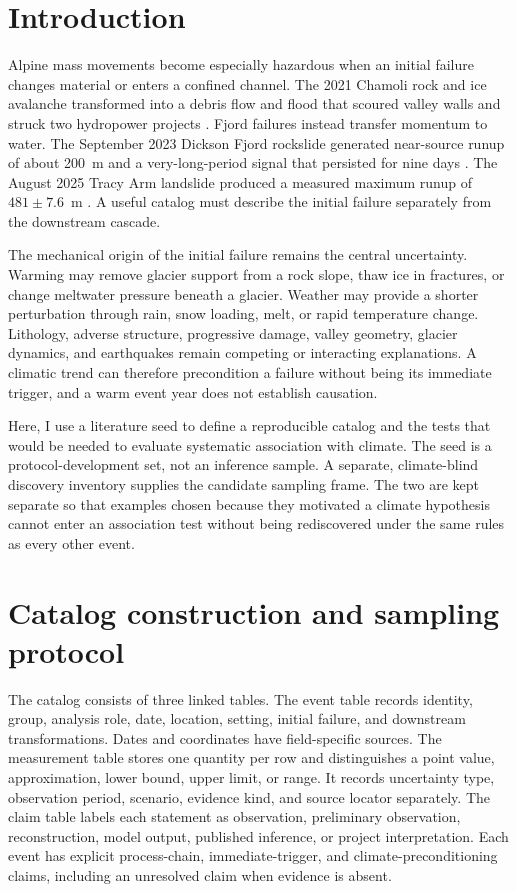 \documentclass[11pt]{article}
\begin{document}
\section{Introduction}

Alpine mass movements become especially hazardous when an initial failure
changes material or enters a confined channel. The 2021 Chamoli rock and ice
avalanche transformed into a debris flow and flood that scoured valley walls
and struck two hydropower projects \citep{Shugar2021}. Fjord failures instead
transfer momentum to water. The September 2023 Dickson Fjord rockslide
generated near-source runup of about 200~m and a very-long-period signal that
persisted for nine days \citep{Svennevig2024,Monahan2025}. The August 2025
Tracy Arm landslide produced a measured maximum runup of
$481\pm7.6$~m \citep{Shugar2026}. A useful catalog must describe the initial
failure separately from the downstream cascade.

The mechanical origin of the initial failure remains the central uncertainty.
Warming may remove glacier support from a rock slope, thaw ice in fractures,
or change meltwater pressure beneath a glacier. Weather may provide a shorter
perturbation through rain, snow loading, melt, or rapid temperature change.
Lithology, adverse structure, progressive damage, valley geometry, glacier
dynamics, and earthquakes remain competing or interacting explanations. A
climatic trend can therefore precondition a failure without being its
immediate trigger, and a warm event year does not establish causation.

Here, I use a literature seed to define a reproducible catalog and the tests
that would be needed to evaluate systematic association with climate. The
seed is a protocol-development set, not an inference sample. A separate,
climate-blind discovery inventory supplies the candidate sampling frame. The
two are kept separate so that examples chosen because they motivated a climate
hypothesis cannot enter an association test without being rediscovered under
the same rules as every other event.

\section{Catalog construction and sampling protocol}

The catalog consists of three linked tables. The event table records identity,
group, analysis role, date, location, setting, initial failure, and downstream
transformations. Dates and coordinates have field-specific sources. The
measurement table stores one quantity per row and distinguishes a point value,
approximation, lower bound, upper limit, or range. It records uncertainty type,
observation period, scenario, evidence kind, and source locator separately.
The claim table labels each statement as observation, preliminary observation,
reconstruction, model output, published inference, or project interpretation.
Each event has explicit process-chain, immediate-trigger, and
climate-preconditioning claims, including an unresolved claim when evidence is
absent.
\end{document}

